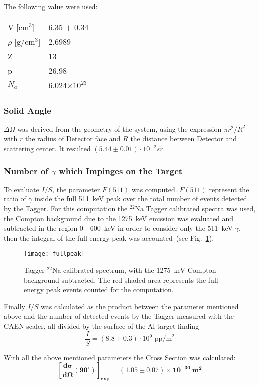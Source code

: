 The following value were used:
\begin{table}[H]
\centering
\begin{tabular}{ll}
\toprule
\toprule
V [cm$^3$] & 6.35 $\pm$ 0.34 \\
$\rho$ [g/cm$^3$] & 2.6989\\
Z & 13 \\
p & 26.98 \\
$N_a$ & 6.024$\times 10^{23}$ \\
\bottomrule
\bottomrule
\end{tabular}
\end{table}
 
\subsubsection*{Solid Angle }
$\Delta\Omega$ was derived from the geometry of the system, using the expression $\pi r^2/R^2$ with $r$ the radius of Detector face and $R$ the distance between Detector and scattering center. It resulted $(5.44\pm0.01)\cdot 10^{-2} sr$. 
  
\subsubsection*{Number of $\gamma$ which Impinges on the Target}
To evaluate $I/S$, the parameter $F(511)$ was computed. $F(511)$ represent the ratio of $\gamma$ inside the full 511~keV peak over the total number of events detected by the Tagger. For this computation the $^{22}$Na Tagger calibrated spectra was used, the Compton background due to the 1275~keV emission was evaluated and subtracted in the region 0 - 600~keV in order to consider only the 511~keV $\gamma$, then the integral of the full energy peak was accounted~(see Fig.~\ref{Fig:F511}).

\begin{figure}[h!]
 \centering
 \texttt{[image: fullpeak]}
 \caption{Tagger $^{22}$Na calibrated spectrum, with the 1275~keV Compton background subtracted. The red shaded area represents the full energy peak events counted for the computation.}
 \label{Fig:F511}
\end{figure}

Finally $I/S$ was calculated as the product between the parameter mentioned above and the number of detected events by the Tagger measured with the CAEN scaler, all divided by the surface of the Al target finding 
\[\dfrac{I}{S} = (8.8\pm0.3)\cdot10^{9} \text{ pp/m}^2\]

\bigskip

With all the above mentioned parameters the Cross Section was calculated:
  \begin{equation*}
  \mathbf{	\left[\frac{d\sigma}{d\Omega}(90^{\circ})\right]_{exp}=(1.05\pm 0.07) \times 10^{-30}\ \text{m}^{2}}
  \end{equation*}
  
  
 
